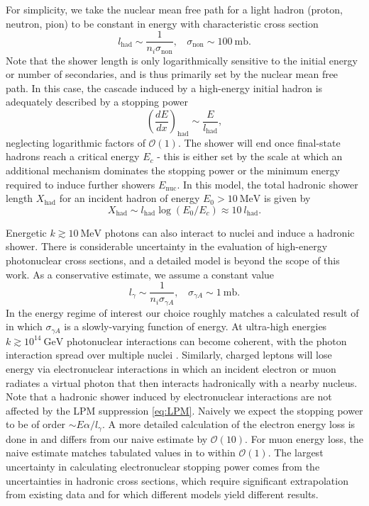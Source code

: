 \documentclass[twocolumn,showpacs,preprintnumbers,amsmath,amssymb,prd]{revtex4}
\newcommand{\OO}{\mathcal{O}}
\def\r{\right)}
\def\l{\left(}
\begin{document}
\begin{appendices}
For simplicity, we take the nuclear mean free path for a light hadron (proton, neutron, pion) to be constant in energy with characteristic cross section
\begin{equation}
l_\text{had} \sim  \frac{1}{n_i \sigma_\text{non}}, ~~~~ \sigma_\text{non} \sim 100 ~\text{mb}. 
\end{equation}
Note that the shower length is only logarithmically sensitive to the initial energy or number of secondaries, and is thus primarily set by the nuclear mean free path. In this case, the cascade induced by a high-energy initial hadron is adequately described by a stopping power
\begin{equation}
\label{eq:nucshower}
\l \frac{dE}{dx}\r_\text{had} \sim \frac{E}{l_\text{had}},
\end{equation}
neglecting logarithmic factors of $\OO(1)$. The shower will end once final-state hadrons reach a critical energy $E_c$ - this is either set by the scale at which an additional mechanism dominates the stopping power or the minimum energy required to induce further showers $E_\text{nuc}$. In this model, the total hadronic shower length $X_{\text{had}}$ for an incident hadron of energy $E_0 > 10 ~\text{MeV}$ is given by
\begin{equation}
X_{\text{had}} \sim l_\text{had} \log{(E_0/E_c)} \approx 10 ~l_\text{had}.
\end{equation}
 
Energetic $k \gtrsim 10 ~\text{MeV}$ photons can also interact to nuclei and induce a hadronic shower. There is considerable uncertainty in the evaluation of high-energy photonuclear cross sections, and a detailed model is beyond the scope of this work. As a conservative estimate, we assume a constant value
\begin{equation}
l_\gamma \sim \frac{1}{n_i \sigma_{\gamma A}}, ~~~~ \sigma_{\gamma A} \sim 1 ~\text{mb}.
\end{equation}
In the energy regime of interest our choice roughly matches a calculated result of \cite{Klein} in which $\sigma_{\gamma A}$ is a slowly-varying function of energy. At ultra-high energies $k \gtrsim 10^{14} ~\text{GeV}$ photonuclear interactions can become coherent, with the photon interaction spread over multiple nuclei \cite{PDG}. Similarly, charged leptons will lose energy via electronuclear interactions in which an incident electron or muon radiates a virtual photon that then interacts hadronically with a nearby nucleus. Note that a hadronic shower induced by electronuclear interactions are not affected by the LPM suppression \eqref{eq:LPM}. Naively we expect the stopping power to be of order $\sim E \alpha/l_\gamma$. A more detailed calculation of the electron energy loss is done in \cite{Klein} and differs from our naive estimate by $\OO(10)$. For muon energy loss, the naive estimate matches tabulated values in \cite{PDG} to within $\OO(1)$. The largest uncertainty in calculating electronuclear stopping power comes from the uncertainties in hadronic cross sections, which require significant extrapolation from existing data and for which different models yield different results. 

\end{appendices}
\end{document}
